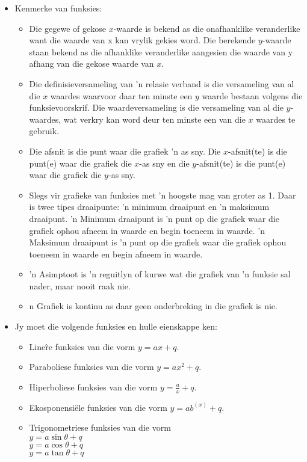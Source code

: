 
\begin{itemize}[noitemsep]
\item Kenmerke van funksies: 
\begin{itemize}[noitemsep]
\item Die gegewe of gekose $x$-waarde is bekend as die onafhanklike veranderlike want die waarde van x kan
vrylik gekies word. Die berekende $y$-waarde staan bekend as die afhanklike veranderlike aangesien
die waarde van y afhang van die gekose waarde van $x$.
\item Die definisieversameling van ’n relasie verband is die versameling van al die $x$ waardes waarvoor daar ten minste een $y$ waarde bestaan volgens die funksievoorskrif. Die waardeversameling is die versameling van al die $y$-waardes, wat verkry kan word deur ten minste een van die $x$ waardes te gebruik.
\item Die afsnit is die punt waar die grafiek ’n as sny. Die $x$-afsnit(te) is die punt(e) waar die grafiek die $x$-as
sny en die $y$-afsnit(te) is die punt(e) waar die grafiek die $y$-as sny. 
\item Slegs vir grafieke van funksies met ’n hoogste mag van groter as 1. Daar is twee tipes draaipunte: ’n
minimum draaipunt en ’n maksimum draaipunt. ’n Minimum draaipunt is ’n punt op die grafiek waar
die grafiek ophou afneem in waarde en begin toeneem in waarde. ’n Maksimum draaipunt is ’n punt
op die grafiek waar die grafiek ophou toeneem in waarde en begin afneem in waarde. 
\item ’n Asimptoot is ’n reguitlyn of kurwe wat die grafiek van ’n funksie sal nader, maar nooit raak nie.
\item n Grafiek is kontinu as daar geen onderbreking in die grafiek is nie. 
\end{itemize}
\item  Jy moet die volgende funksies en hulle eienskappe ken:
    \begin{itemize}[noitemsep]
    \item Line\^re funksies van die vorm $y=ax+q$. 
    \item Paraboliese funksies van die vorm $y=a{x}^{2}+q$.
    \item Hiperboliese funksies van die vorm $y=\frac{a}{x}+q$. 
    \item Ekosponensi\"ele funksies van die vorm $y=a{b}^{(x)}+q$. 
    \item Trigonometriese funksies van die vorm 
	  \\$y=a\sin\theta+q$ \\$y=a\cos\theta+q$\\ $y=a\tan\theta+q$ 
    \end{itemize}
\end{itemize}

